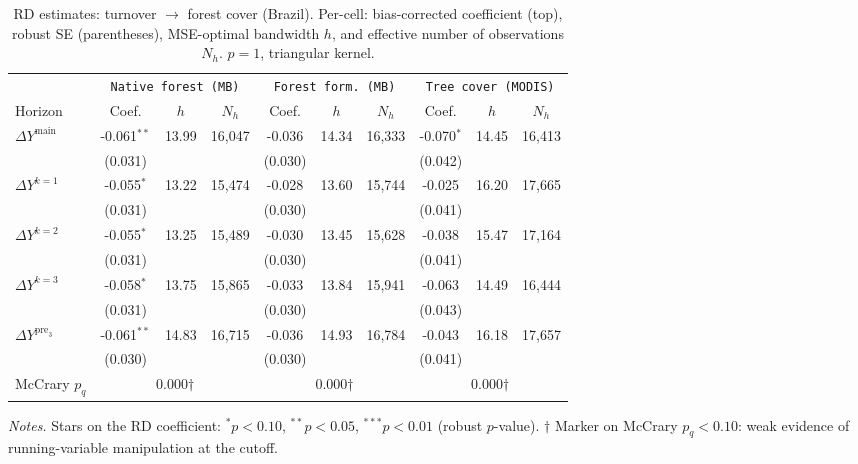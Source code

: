 \documentclass[11pt]{article}
\begin{document}
\begin{table}[H]
\centering
\scriptsize
\caption{RD estimates: turnover $\to$ forest cover (Brazil). Per-cell:
bias-corrected coefficient (top), robust SE (parentheses), MSE-optimal
bandwidth $h$, and effective number of observations $N_h$. $p=1$,
triangular kernel.}
\label{tab:rd_brasil}
\begin{tabular}{l ccc ccc ccc}
\toprule

 & \multicolumn{3}{c}{\texttt{Native forest (MB)}} & \multicolumn{3}{c}{\texttt{Forest form. (MB)}} & \multicolumn{3}{c}{\texttt{Tree cover (MODIS)}} \\
\cmidrule(lr){2-4} \cmidrule(lr){5-7} \cmidrule(lr){8-10}
Horizon & Coef. & $h$ & $N_h$ & Coef. & $h$ & $N_h$ & Coef. & $h$ & $N_h$ \\
\midrule
$\Delta Y^{\text{main}}$ & -0.061$^{**}$ & 13.99 & 16,047 & -0.036 & 14.34 & 16,333 & -0.070$^{*}$ & 14.45 & 16,413 \\
 & (0.031) &  &  & (0.030) &  &  & (0.042) &  &  \\
\addlinespace[1pt]
$\Delta Y^{k=1}$ & -0.055$^{*}$ & 13.22 & 15,474 & -0.028 & 13.60 & 15,744 & -0.025 & 16.20 & 17,665 \\
 & (0.031) &  &  & (0.030) &  &  & (0.041) &  &  \\
\addlinespace[1pt]
$\Delta Y^{k=2}$ & -0.055$^{*}$ & 13.25 & 15,489 & -0.030 & 13.45 & 15,628 & -0.038 & 15.47 & 17,164 \\
 & (0.031) &  &  & (0.030) &  &  & (0.041) &  &  \\
\addlinespace[1pt]
$\Delta Y^{k=3}$ & -0.058$^{*}$ & 13.75 & 15,865 & -0.033 & 13.84 & 15,941 & -0.063 & 14.49 & 16,444 \\
 & (0.031) &  &  & (0.030) &  &  & (0.043) &  &  \\
\addlinespace[1pt]
$\Delta Y^{\text{pre}_3}$ & -0.061$^{**}$ & 14.83 & 16,715 & -0.036 & 14.93 & 16,784 & -0.043 & 16.18 & 17,657 \\
 & (0.030) &  &  & (0.030) &  &  & (0.041) &  &  \\
\addlinespace[1pt]
\midrule
McCrary $p_q$ & \multicolumn{3}{c}{0.000$\dagger$} & \multicolumn{3}{c}{0.000$\dagger$} & \multicolumn{3}{c}{0.000$\dagger$} \\
\bottomrule
\end{tabular}
\begin{flushleft}\footnotesize
\textit{Notes.} Stars on the RD coefficient: $^{*}p<0.10$,
$^{**}p<0.05$, $^{***}p<0.01$ (robust $p$-value).
$\dagger$ Marker on McCrary $p_q<0.10$: weak evidence of running-variable
manipulation at the cutoff.\\
\end{flushleft}
\end{table}
\end{document}

